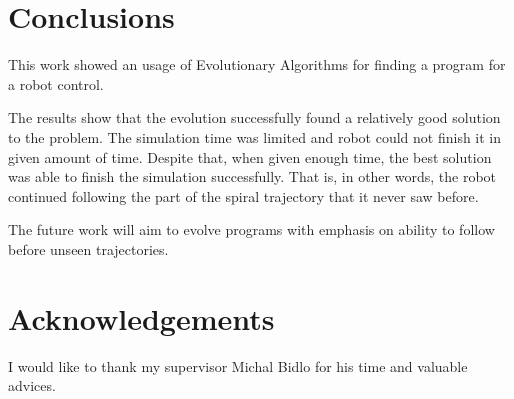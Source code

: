 \documentclass{ExcelAtFIT}
\begin{document}

\section{Conclusions}
\label{sec:Conclusions}

This work showed an usage of Evolutionary Algorithms for finding a program for a robot control.

The results show that the evolution successfully found a relatively good solution to the problem.
The simulation time was limited and robot could not finish it in given amount of time.
Despite that, when given enough time, the best solution was able to finish the simulation successfully.
That is, in other words, the robot continued following the part of the spiral trajectory that it never saw before.

The future work will aim to evolve programs with emphasis on ability to follow before unseen trajectories.


\section*{Acknowledgements}
I would like to thank my supervisor Michal Bidlo for his time and valuable advices.




\end{document}
